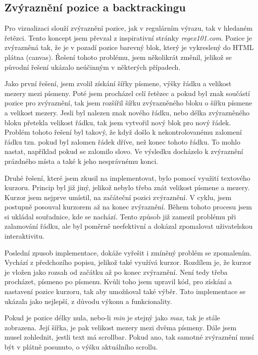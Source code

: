 \subsection*{Zvýraznění pozice a backtrackingu}

Pro vizualizaci slouží zvýraznění pozice, jak v regulárním výrazu, tak v hledaném řetězci.
Tento koncept jsem převzal z inspirativní stránky \textit{regex101.com}.
Pozice je zvýrazněná tak, že je v pozadí pozice barevný blok, který je vykreslený do HTML plátna (canvas).
Řešení tohoto problému, jsem několikrát změnil, jelikož se původní řešení ukázalo neúčinným v některých případech.

Jako první řešení, jsem zvolil získání šířky písmene, výšky řádku a velikost mezery mezi písmeny.
Poté jsem procházel celí řetězec a pokud byl znak součástí pozice pro zvýraznění, tak jsem rozšířil šířku zvýrazněného bloku o šířku písmene a velikost mezery.
Jesli byl nalezen znak nového řádku, nebo délka zvýrazněného bloku přetekla velikost řádku, tak jsem vytvořil nový blok pro nový řádek.
Problém tohoto řešení byl takový, že když došlo k nekontrolovanému zalomení řádku tzn. pokud byl zalomen řádek dříve, než konec tohoto řádku.
To mohlo nastat, například pokud se zalomilo slovo.
Ve výsledku docházelo k zvýraznění prázdného místa a také k jeho nesprávnému konci.

Druhé řešení, které jsem zkusil na implementovat, bylo pomocí využití textového kurzoru.
Princip byl již jiný, jelikož nebylo třeba znát velikost písmene a mezery.
Kurzor jsem nejprve umístil, na začáteční pozici zvýraznění. 
V cyklu, jsem postupně posouval kurzorem až na konec zvýraznění.
Během tohoto procesu jsem si ukládal souřadnice, kde se nachází.
Tento způsob již zamezil problému při zalamování řádku, ale byl poměrně neefektivní a dokázal zpomalovat uživatelskou interaktivitu.

Poslední zpusob implementace, dokáže vyřešit i zmíněný problém se zpomalením.
Vychází z předchozího popisu, jelikož také využívá kurzor.
Rozdílem je, že kurzor je vložen jako rozsah od začátku až po konec zvýraznění.
Není tedy třeba procházet, písmeno po písmenu.
Kvůli toho jsem upravil kód, pro získání a nastavení pozice kurzoru, tak aby umožňoval také výběr.
Tato implementace se ukázala jako nejlepší, z důvodu výkonu a funkcionality.

Pokud je pozice délky nula, nebo-li \textit{min} je stejný jako \textit{max}, tak je stále zobrazena. 
Její šířka, je pak velikost mezery mezi dvěma písmeny. 
Dále jsem musel zohlednit, jestli text má scrollbar. 
Pokud ano, tak samotné zvýraznění musí být v plátně posunuto, o výšku aktuálního scrollu.

